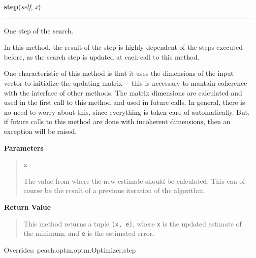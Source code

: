     \begin{boxedminipage}{\textwidth}

    \raggedright \textbf{step}(\textit{self}, \textit{x})

    \vspace{-1.5ex}

    \rule{\textwidth}{0.5\fboxrule}

One step of the search.

In this method, the result of the step is highly dependent of the steps
executed before, as the search step is updated at each call to this
method.

One characteristic of this method is that it uses the dimensions of the
input vector to initialize the updating matrix -{}- this is necessary to
mantain coherence with the interface of other methods. The matrix
dimensions are calculated and used in the first call to this method and
used in future calls. In general, there is no need to worry about this,
since everything is taken care of automatically. But, if future calls to
this method are done with incoherent dimensions, then an exception will
be raised.
    \vspace{1ex}

      \textbf{Parameters}
      \begin{quote}
        \begin{Ventry}{x}

          \item[x]


The value from where the new estimate should be calculated. This can
of course be the result of a previous iteration of the algorithm.
        \end{Ventry}

      \end{quote}

    \vspace{1ex}

      \textbf{Return Value}
      \begin{quote}

This method returns a tuple \texttt{(x, e)}, where \texttt{x} is the updated
estimate of the minimum, and \texttt{e} is the estimated error.
      \end{quote}

    \vspace{1ex}

      Overrides: peach.optm.optm.Optimizer.step

    \end{boxedminipage}

